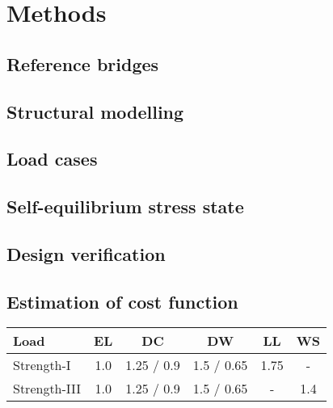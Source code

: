\section{Methods}\label{sec:methods}
\subsection{Reference bridges}

\subsection{Structural modelling}

\subsection{Load cases}

\subsection{Self-equilibrium stress state}

\subsection{Design verification}

\subsection{Estimation of cost function}

\begin{table}[H]
\begin{tabular}{lccccc}
\hline
Load         & EL  & DC         & DW         & LL   & WS  \\ \hline
Strength-I   & 1.0 & 1.25 / 0.9 & 1.5 / 0.65 & 1.75 & -   \\
Strength-III & 1.0 & 1.25 / 0.9 & 1.5 / 0.65 & -    & 1.4 \\ \hline
\end{tabular}
\end{table}



